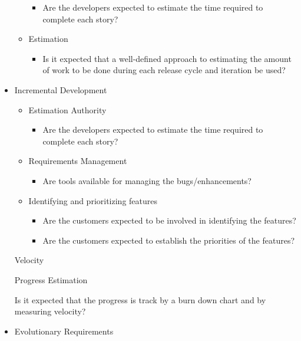 \begin{appendices}
\begin{itemize}
\begin{itemize}
				\begin{itemize}
					\item Are the developers expected to estimate the time required to complete each story?
				\end{itemize}
			\item Estimation
				\begin{itemize}
					\item Is it expected that a well-defined approach to estimating the amount of work to be done during each release cycle and iteration be used?
				\end{itemize}
		\end{itemize}
	\item Incremental Development
		\begin{itemize}
			\item Estimation Authority
				\begin{itemize}
					\item Are the developers expected to estimate the time required to complete each story?
				\end{itemize}
			\item Requirements Management
				\begin{itemize}
					\item Are tools available for managing the bugs/enhancements?
				\end{itemize}
			\item Identifying and prioritizing features
				\begin{itemize}
					\item Are the customers expected to be involved in identifying the features?
					\item Are the customers expected to establish the priorities of the features?
				\end{itemize}
		\end{itemize}
	\addition Velocity
		\begin{itemize}
			\addition Progress Estimation
				\begin{itemize}
					\addition Is it expected that the progress is track by a burn down chart and by measuring velocity?
				\end{itemize}
		\end{itemize}
	\item Evolutionary Requirements

\end{itemize}
\end{appendices}
